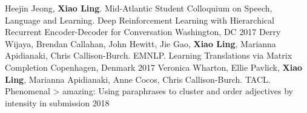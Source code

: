 
\begin{cventries}
  \cventrypublication
    {Heejin Jeong, \textbf{Xiao Ling}.  Mid-Atlantic Student Colloquium on Speech, Language and Learning.}
    {Deep Reinforcement Learning with Hierarchical Recurrent Encoder-Decoder for Conversation}
    {Washington, DC}
    {2017}
    {}
  \cventrypublication
    {Derry Wijaya, Brendan Callahan, John Hewitt, Jie Gao, \textbf{Xiao Ling}, Marianna Apidianaki, Chris Callison-Burch. EMNLP.}
    {Learning Translations via Matrix Completion}
    {Copenhagen, Denmark}
    {2017}
    {}
  \cventrypublication
    {Veronica Wharton, Ellie Pavlick, \textbf{Xiao Ling}, Marianna Apidianaki, Anne Cocos, Chris Callison-Burch. TACL.}
    {Phenomenal > amazing: Using paraphrases to cluster and order adjectives by intensity}
    {in submission}
    {2018}
    {}
\end{cventries}


